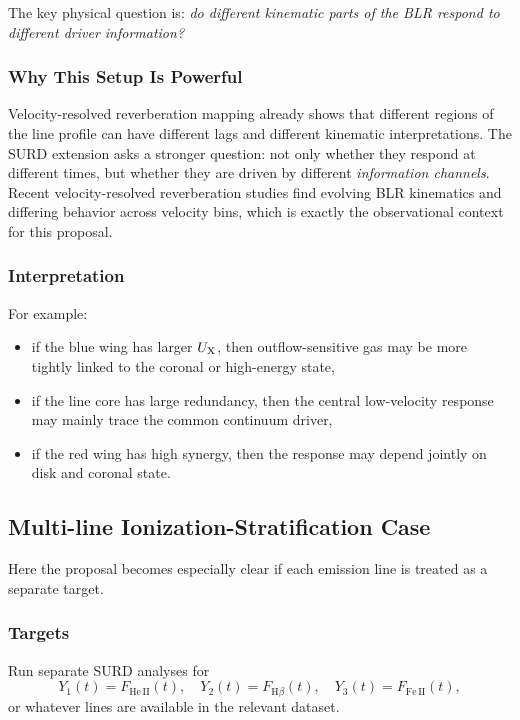 \documentclass{article}
\begin{document}
The key physical question is: \emph{do different kinematic parts of the BLR respond to different driver information?}

\subsubsection{Why This Setup Is Powerful}

Velocity-resolved reverberation mapping already shows that different regions of the line profile can have different lags and different kinematic interpretations. The SURD extension asks a stronger question: not only whether they respond at different times, but whether they are driven by different \emph{information channels}. Recent velocity-resolved reverberation studies find evolving BLR kinematics and differing behavior across velocity bins, which is exactly the observational context for this proposal.

\subsubsection{Interpretation}

For example:
\begin{itemize}
    \item if the blue wing has larger \(U_{\rm X}\), then outflow-sensitive gas may be more tightly linked to the coronal or high-energy state,
    \item if the line core has large redundancy, then the central low-velocity response may mainly trace the common continuum driver,
    \item if the red wing has high synergy, then the response may depend jointly on disk and coronal state.
\end{itemize}

\subsection{Multi-line Ionization-Stratification Case}

Here the proposal becomes especially clear if each emission line is treated as a separate target.

\subsubsection{Targets}

Run separate SURD analyses for
\[
Y_1(t)=F_{\mathrm{He\,II}}(t),\quad
Y_2(t)=F_{\mathrm{H}\beta}(t),\quad
Y_3(t)=F_{\mathrm{Fe\,II}}(t),
\]
or whatever lines are available in the relevant dataset.
\end{document}
